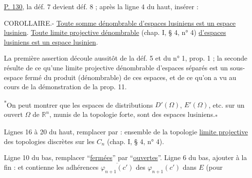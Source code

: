 \uline{P. 130}, la déf. 7 devient déf. 8 ; après la ligne 4 du haut, insérer :

COROLLAIRE.- \uline{Toute somme dénombrable d'espaces lusiniens est un espace lusinien}.
\uline{Toute limite projective dénombrable} (chap. I, § 4, n° 4) \uline{d'espaces lusiniens est un espace lusinien}.

La première assertion découle aussitôt de la déf. 5 et du n° 1, prop. 1 ; la seconde résulte de ce qu'une limite projective dénombrable d'espaces séparés est un sous-espace fermé du produit (dénombrable) de ces espaces, et de ce qu'on a vu au cours de la démonstration de la prop. 11.

\textsuperscript{*}On peut montrer que les espaces de distributions $D'(\Omega)$, $E'(\Omega)$, etc. sur un ouvert $\Omega$ de $\mathbb R^n$, munis de la topologie forte, sont des espaces lusiniens.\textsubscript{*}

Lignes 16 à 20 du haut, remplacer par : ensemble de la topologie \uline{limite projective} des topologies discrètes sur les $C_n$ (chap. I, § 4, n° 4).

Ligne 10 du bas, remplacer ``\uline{fermées}'' par ``\uline{ouvertes}''. Ligne 6 du bas, ajouter à la fin : et contienne les adhérences $\overline{\varphi_{n+1}(c')}$ des $\varphi_{n+1}(c')$ dans $E$ (pour
